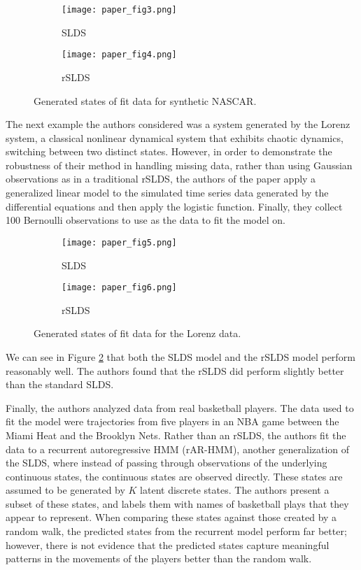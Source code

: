 \begin{figure}[h!]
	\centering
	\begin{subfigure}[b]{0.35\textwidth}
		\texttt{[image: paper\_fig3.png]}
		\caption{SLDS}
	\end{subfigure}
	\begin{subfigure}[b]{0.35\textwidth}
		\texttt{[image: paper\_fig4.png]}
		\caption{rSLDS}
	\end{subfigure}
	\caption{Generated states of fit data for synthetic NASCAR.}
	\label{Nascargen}
\end{figure}

The next example the authors considered was a system generated by the Lorenz system, a classical nonlinear dynamical system that exhibits chaotic dynamics, switching between two distinct states. However, in order to demonstrate the robustness of their method in handling missing data, rather than using Gaussian observations as in a traditional rSLDS, the authors of the paper apply a generalized linear model to the simulated time series data generated by the differential equations and then apply the logistic function. Finally, they collect 100 Bernoulli observations to use as the data to fit the model on.

\begin{figure}[h!]
	\centering
	\begin{subfigure}[b]{0.35\textwidth}
		\texttt{[image: paper\_fig5.png]}
		\caption{SLDS}
	\end{subfigure}
	\begin{subfigure}[b]{0.35\textwidth}
		\texttt{[image: paper\_fig6.png]}
		\caption{rSLDS}
	\end{subfigure}
	\caption{Generated states of fit data for the Lorenz data.}
	\label{Lorenzgen}
\end{figure}

We can see in Figure \ref{Lorenzgen} that both the SLDS model and the rSLDS model perform reasonably well. The authors found that the rSLDS did perform slightly better than the standard SLDS.

Finally, the authors analyzed data from real basketball players. The data used to fit the model were trajectories from five players in an NBA game between the Miami Heat and the Brooklyn Nets. Rather than an rSLDS, the authors fit the data to a recurrent autoregressive HMM (rAR-HMM), another generalization of the SLDS, where instead of passing through observations of the underlying continuous states, the continuous states are observed directly. These states are assumed to be generated by $K$ latent discrete states. The authors present a subset of these states, and labels them with names of basketball plays that they appear to represent. When comparing these states against those created by a random walk, the predicted states from the recurrent model perform far better; however, there is not evidence that the predicted states capture meaningful patterns in the movements of the players better than the random walk.

